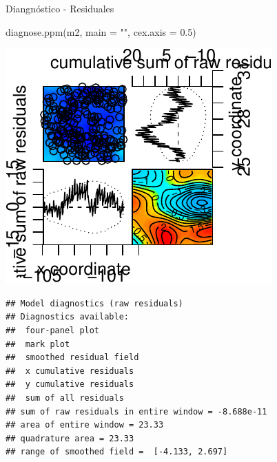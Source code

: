 \documentclass[
  11pt,
  ignorenonframetext,
]{beamer}
\newenvironment{Shaded}{}{}
\newcommand{\AttributeTok}[1]{\textcolor[rgb]{0.49,0.56,0.16}{#1}}
\newcommand{\FloatTok}[1]{\textcolor[rgb]{0.25,0.63,0.44}{#1}}
\newcommand{\FunctionTok}[1]{\textcolor[rgb]{0.02,0.16,0.49}{#1}}
\newcommand{\NormalTok}[1]{#1}
\newcommand{\StringTok}[1]{\textcolor[rgb]{0.25,0.44,0.63}{#1}}
\begin{document}
\begin{frame}[fragile]{Diangnóstico - Residuales}
\protect\hypertarget{diangnuxf3stico---residuales}{}
\begin{Shaded}
\begin{Highlighting}[]
\FunctionTok{diagnose.ppm}\NormalTok{(m2, }\AttributeTok{main =} \StringTok{""}\NormalTok{, }\AttributeTok{cex.axis =} \FloatTok{0.5}\NormalTok{)}
\end{Highlighting}
\end{Shaded}

\includegraphics{Tutorial-spatstat-2_files/figure-beamer/unnamed-chunk-18-1.pdf}

\begin{verbatim}
## Model diagnostics (raw residuals)
## Diagnostics available:
##  four-panel plot
##  mark plot 
##  smoothed residual field
##  x cumulative residuals
##  y cumulative residuals
##  sum of all residuals
## sum of raw residuals in entire window = -8.688e-11
## area of entire window = 23.33
## quadrature area = 23.33
## range of smoothed field =  [-4.133, 2.697]
\end{verbatim}
\end{frame}
\end{document}
